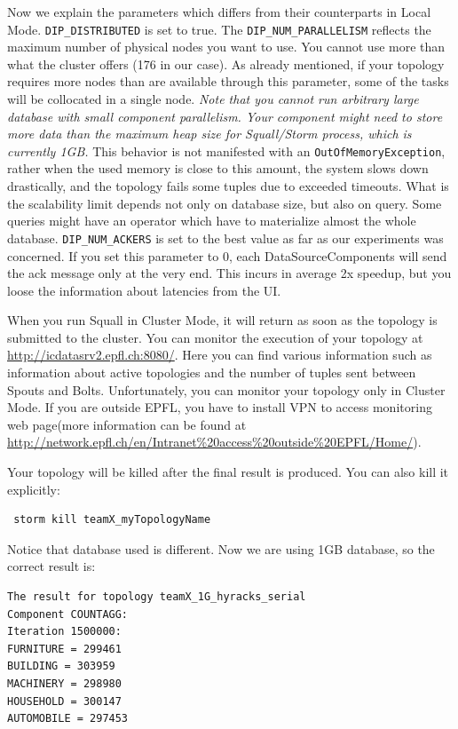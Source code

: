 \documentclass[a4paper,10pt]{article}
\begin{document}
Now we explain the parameters which differs from their counterparts in Local Mode. \verb|DIP_DISTRIBUTED| is set to true. The \verb|DIP_NUM_PARALLELISM| reflects the maximum number of physical nodes you want to use. You cannot use more than what the cluster offers (176 in our case). As already mentioned, if your topology requires more nodes than are available through this parameter, some of the tasks will be collocated in a single node. \textit{Note that you cannot run arbitrary large database with small component parallelism. Your component might need to store more data than the maximum heap size for Squall/Storm process, which is currently 1GB.} This behavior is not manifested with an \verb|OutOfMemoryException|, rather when the used memory is close to this amount, the system slows down drastically, and the topology fails some tuples due to exceeded timeouts. What is the scalability limit depends not only on database size, but also on query. Some queries might have an operator which have to materialize almost the whole database. \verb|DIP_NUM_ACKERS| is set to the best value as far as our experiments was concerned. If you set this parameter to 0, each DataSourceComponents will send the ack message only at the very end. This incurs in average 2x speedup, but you loose the information about latencies from the UI.

When you run Squall in Cluster Mode, it will return as soon as the topology is submitted to the cluster. You can monitor the execution of your topology at \url{http://icdatasrv2.epfl.ch:8080/}. Here you can find various information such as information about active topologies and the number of tuples sent between Spouts and Bolts. Unfortunately, you can monitor your topology only in Cluster Mode. If you are outside EPFL, you have to install VPN to access monitoring web page(more information can be found at \url{http://network.epfl.ch/en/Intranet\%20access\%20outside\%20EPFL/Home/}).

Your topology will be killed after the final result is produced. You can also kill it explicitly:
\begin{verbatim}
 storm kill teamX_myTopologyName
\end{verbatim}

Notice that database used is different. Now we are using 1GB database, so the correct result is:
\begin{verbatim}
The result for topology teamX_1G_hyracks_serial
Component COUNTAGG:
Iteration 1500000:
FURNITURE = 299461
BUILDING = 303959
MACHINERY = 298980
HOUSEHOLD = 300147
AUTOMOBILE = 297453
\end{verbatim}
\end{document}

